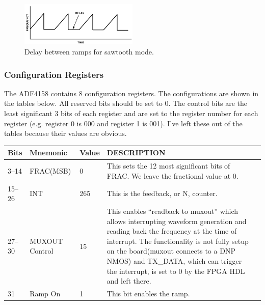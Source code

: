 \begin{figure}[h]
        \centering
        \includegraphics[width=0.5\textwidth]{data/adf4158-delay.png}
        \caption{Delay between ramps for sawtooth mode.}
        \label{fig:adf4158-delay}
\end{figure}

\subsubsection{Configuration Registers}
\label{sec:adf4158-config-regs}

The ADF4158 contains 8 configuration registers. The configurations are shown in the tables
below. All reserved bits should be set to 0. The control bits are the least significant 3 bits of
each register and are set to the register number for each register (e.g. register 0 is 000 and
register 1 is 001). I've left these out of the tables because their values are obvious.

\label{tab:adf4158-reg-map-0}
\begin{tabularx}{\textwidth}{l l l X>{\raggedright\arraybackslash}X}
        \caption{FRAC/INT REGISTER (R0) MAP} \\
        \toprule
        \textbf{Bits} & \textbf{Mnemonic} & \textbf{Value} & \textbf{DESCRIPTION} \\
        \midrule

        \endhead{}

        3--14 & FRAC(MSB) & 0 & This sets the 12 most significant bits of FRAC. We leave the fractional
        value at 0. \\
        15--26 & INT & 265 & This is the feedback, or N, counter. \\
        27--30 & MUXOUT Control & 15 & This enables ``readback to muxout'' which allows interrupting
        waveform generation and reading back the frequency at the time of
        interrupt. The functionality is not fully setup on the board(muxout
        connects to a DNP NMOS) and TX\_DATA, which can trigger the
        interrupt, is set to 0 by the FPGA HDL and left there. \\
        31 & Ramp On & 1 & This bit enables the ramp. \\

        \bottomrule
\end{tabularx}

